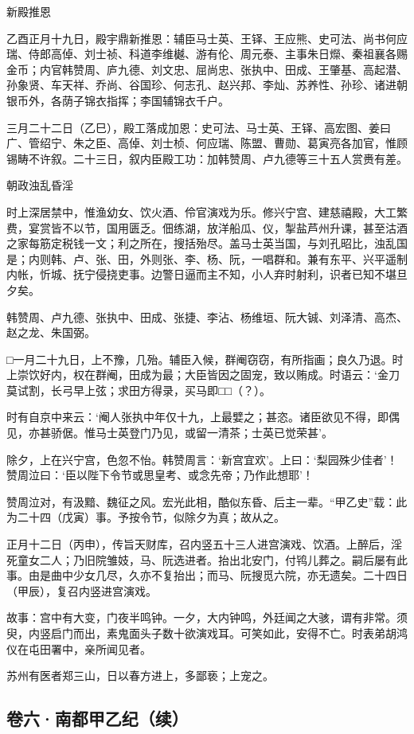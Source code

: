 \documentclass[]{article}
\begin{document}
新殿推恩

乙酉正月十九日，殿宇鼎新推恩：辅臣马士英、王铎、王应熊、史可法、尚书何应瑞、侍郎高倬、刘士祯、科道李维樾、游有伦、周元泰、主事朱日爃、秦祖襄各赐金币；内官韩赞周、庐九德、刘文忠、屈尚忠、张执中、田成、王肇基、高起潜、孙象贤、车天祥、乔尚、谷国珍、何志孔、赵兴邦、李灿、苏养性、孙珍、诸进朝银币外，各荫子锦衣指挥；李国辅锦衣千户。

三月二十二日（乙巳），殿工落成加恩：史可法、马士英、王铎、高宏图、姜曰广、管绍宁、朱之臣、高倬、刘士桢、何应瑞、陈盟、曹勋、葛寅亮各加官，惟顾锡畴不许叙。二十三日，叙内臣殿工功：加韩赞周、卢九德等三十五人赏赉有差。

朝政浊乱昏淫

时上深居禁中，惟渔幼女、饮火酒、伶官演戏为乐。修兴宁宫、建慈禧殿，大工繁费，宴赏皆不以节，国用匮乏。佃练湖，放洋船瓜、仪，掣盐芦州升课，甚至沽酒之家每筋定税钱一文；利之所在，搜括殆尽。盖马士英当国，与刘孔昭比，浊乱国是；内则韩、卢、张、田，外则张、李、杨、阮，一唱群和。兼有东平、兴平遥制内帐，忻城、抚宁侵挠吏事。边警日逼而主不知，小人弃时射利，识者已知不堪旦夕矣。

韩赞周、卢九德、张执中、田成、张捷、李沾、杨维垣、阮大铖、刘泽清、高杰、赵之龙、朱国弼。

□一月二十九日，上不豫，几殆。辅臣入候，群阉窃窃，有所指画；良久乃退。时上崇饮好内，权在群阉，田成为最；大臣皆因之固宠，致以贿成。时语云：`金刀莫试割，长弓早上弦；求田方得录，买马即□□（？）。

时有自京中来云：`阉人张执中年仅十九，上最嬖之；甚恣。诸臣欲见不得，即偶见，亦甚骄倨。惟马士英登门乃见，或留一清茶；士英已觉荣甚'。

除夕，上在兴宁宫，色忽不怡。韩赞周言：`新宫宜欢'。上曰：`梨园殊少佳者'！赞周泣曰：`臣以陛下令节或思皇考、或念先帝；乃作此想耶'！

赞周泣对，有汲黯、魏征之风。宏光此相，酷似东昏、后主一辈。``甲乙史''载：此为二十四（戊寅）事。予按令节，似除夕为真；故从之。

正月十二日（丙申），传旨天财库，召内竖五十三人进宫演戏、饮酒。上醉后，淫死童女二人；乃旧院雏妓，马、阮选进者。抬出北安门，付鸨儿葬之。嗣后屡有此事。由是曲中少女几尽，久亦不复抬出；而马、阮搜觅六院，亦无遗矣。二十四日（甲辰），复召内竖进宫演戏。

故事：宫中有大变，门夜半鸣钟。一夕，大内钟鸣，外廷闻之大骇，谓有非常。须臾，内竖启门而出，素鬼面头子数十欲演戏耳。可笑如此，安得不亡。时表弟胡鸿仪在屯田署中，亲所闻见者。

苏州有医者郑三山，日以春方进上，多鄙亵；上宠之。

\hypertarget{header-n42}{%
\subsection{卷六·南都甲乙纪（续）}\label{header-n42}}
\end{document}
